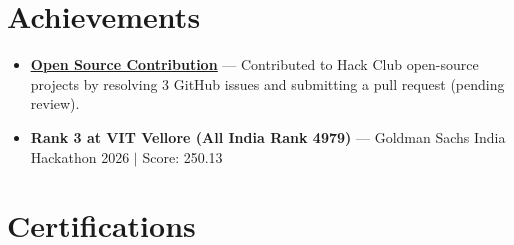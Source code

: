 \documentclass[a4paper,10pt]{article}
\newcommand{\ulink}[2]{\href{#1}{\uline{#2}}}
\begin{document}
\vspace{2pt}

\section{Achievements}
\vspace{2pt}
\begin{itemize}[nosep, leftmargin=1.5em, itemsep=1pt, topsep=2pt]
  \item {\color[HTML]{0A0A0A}\fontsize{11}{14}\selectfont \ulink{https://github.com/hackclub/stardance/graphs/contributors?all=1}{\textbf{Open Source Contribution}} --- Contributed to Hack Club open-source projects by resolving 3 GitHub issues and submitting a pull request (pending review).}
  \item {\color[HTML]{0A0A0A}\fontsize{11}{14}\selectfont \textbf{Rank 3 at VIT Vellore (All India Rank 4979)} --- Goldman Sachs India Hackathon 2026 $|$ Score: 250.13}
\end{itemize}

\vspace{2pt}

\section{Certifications}
\vspace{2pt}
\end{document}
